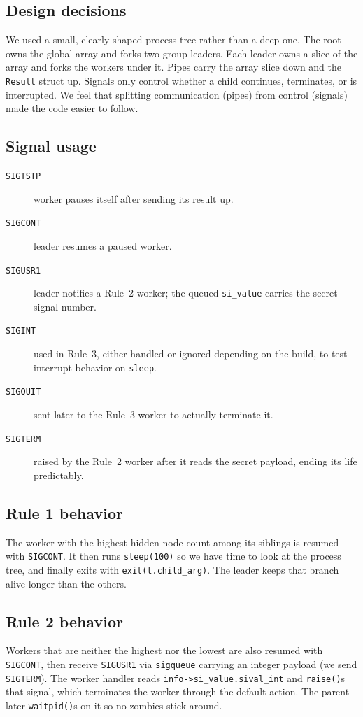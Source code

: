 \documentclass[11pt]{article}
\begin{document}
\subsection*{Design decisions}
We used a small, clearly shaped process tree rather than a deep one. The root
owns the global array and forks two group leaders. Each leader owns a slice of
the array and forks the workers under it. Pipes carry the array slice down and
the \texttt{Result} struct up. Signals only control whether a child continues,
terminates, or is interrupted. We feel that splitting communication (pipes)
from control (signals) made the code easier to follow.

\subsection*{Signal usage}
\begin{description}
  \item[\texttt{SIGTSTP}] worker pauses itself after sending its result up.
  \item[\texttt{SIGCONT}] leader resumes a paused worker.
  \item[\texttt{SIGUSR1}] leader notifies a Rule~2 worker; the queued
        \texttt{si\_value} carries the secret signal number.
  \item[\texttt{SIGINT}] used in Rule~3, either handled or ignored depending
        on the build, to test interrupt behavior on \texttt{sleep}.
  \item[\texttt{SIGQUIT}] sent later to the Rule~3 worker to actually
        terminate it.
  \item[\texttt{SIGTERM}] raised by the Rule~2 worker after it reads the
        secret payload, ending its life predictably.
\end{description}

\subsection*{Rule 1 behavior}
The worker with the highest hidden-node count among its siblings is resumed
with \texttt{SIGCONT}. It then runs \texttt{sleep(100)} so we have time to look
at the process tree, and finally exits with \texttt{exit(t.child\_arg)}. The
leader keeps that branch alive longer than the others.

\subsection*{Rule 2 behavior}
Workers that are neither the highest nor the lowest are also resumed with
\texttt{SIGCONT}, then receive \texttt{SIGUSR1} via \texttt{sigqueue} carrying
an integer payload (we send \texttt{SIGTERM}). The worker handler reads
\texttt{info-\textgreater si\_value.sival\_int} and \texttt{raise()}s that
signal, which terminates the worker through the default action. The parent
later \texttt{waitpid()}s on it so no zombies stick around.
\end{document}
